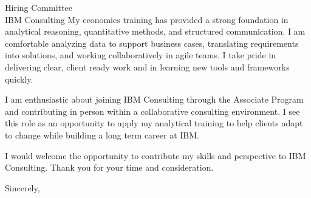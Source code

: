 \documentclass[11pt]{letter}
\begin{document}
\begin{letter}{Hiring Committee \\ IBM Consulting}
My economics training has provided a strong foundation in analytical reasoning, quantitative methods, and structured communication. I am comfortable analyzing data to support business cases, translating requirements into solutions, and working collaboratively in agile teams. I take pride in delivering clear, client ready work and in learning new tools and frameworks quickly.

I am enthusiastic about joining IBM Consulting through the Associate Program and contributing in person within a collaborative consulting environment. I see this role as an opportunity to apply my analytical training to help clients adapt to change while building a long term career at IBM.

I would welcome the opportunity to contribute my skills and perspective to IBM Consulting. Thank you for your time and consideration.

\closing{Sincerely,}

\end{letter}
\end{document}
